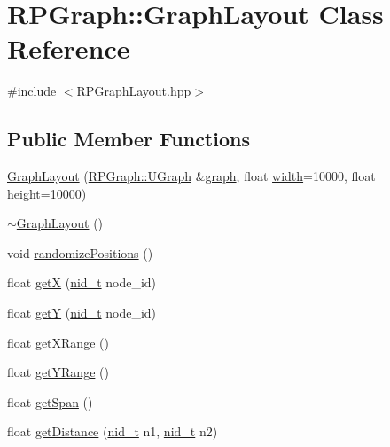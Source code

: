 \hypertarget{classRPGraph_1_1GraphLayout}{}\section{R\+P\+Graph\+:\+:Graph\+Layout Class Reference}
\label{classRPGraph_1_1GraphLayout}


{\ttfamily \#include $<$R\+P\+Graph\+Layout.\+hpp$>$}

\subsection*{Public Member Functions}
\begin{DoxyCompactItemize}
\item 
\mbox{\hyperlink{classRPGraph_1_1GraphLayout_a3d1840f5ef30c9c7a6ce5d41b54230ef}{Graph\+Layout}} (\mbox{\hyperlink{classRPGraph_1_1UGraph}{R\+P\+Graph\+::\+U\+Graph}} \&\mbox{\hyperlink{classRPGraph_1_1GraphLayout_af44bb2c10eee4ef67c95355ce93432a5}{graph}}, float \mbox{\hyperlink{classRPGraph_1_1GraphLayout_ade29dd5ff17faff96348650a99bd120c}{width}}=10000, float \mbox{\hyperlink{classRPGraph_1_1GraphLayout_a86a79a0329c88ef7cef8d57fce9f0e1b}{height}}=10000)
\item 
\mbox{\hyperlink{classRPGraph_1_1GraphLayout_a284707481e0ba81f1dec33a03bc1293c}{$\sim$\+Graph\+Layout}} ()
\item 
void \mbox{\hyperlink{classRPGraph_1_1GraphLayout_a5d5912f46f1b6bf1bf1ee5850cbd818e}{randomize\+Positions}} ()
\item 
float \mbox{\hyperlink{classRPGraph_1_1GraphLayout_a447d80a00c47ad2fb446e3653face38c}{getX}} (\mbox{\hyperlink{namespaceRPGraph_ab3ae34f1ab88e48f43794c30c8697b74}{nid\+\_\+t}} node\+\_\+id)
\item 
float \mbox{\hyperlink{classRPGraph_1_1GraphLayout_a75826cfc0cc24fd4902758bc1ad42c4b}{getY}} (\mbox{\hyperlink{namespaceRPGraph_ab3ae34f1ab88e48f43794c30c8697b74}{nid\+\_\+t}} node\+\_\+id)
\item 
float \mbox{\hyperlink{classRPGraph_1_1GraphLayout_a18a15867788b88db16f0938540107748}{get\+X\+Range}} ()
\item 
float \mbox{\hyperlink{classRPGraph_1_1GraphLayout_aeba4c2af91bcc996e159eebbb049c276}{get\+Y\+Range}} ()
\item 
float \mbox{\hyperlink{classRPGraph_1_1GraphLayout_a805e477534bbf72275ecf8d5ec396da4}{get\+Span}} ()
\item 
float \mbox{\hyperlink{classRPGraph_1_1GraphLayout_abdfcbd0f0fea5c5fdf237a7dc653ca13}{get\+Distance}} (\mbox{\hyperlink{namespaceRPGraph_ab3ae34f1ab88e48f43794c30c8697b74}{nid\+\_\+t}} n1, \mbox{\hyperlink{namespaceRPGraph_ab3ae34f1ab88e48f43794c30c8697b74}{nid\+\_\+t}} n2)

\end{DoxyCompactItemize}
